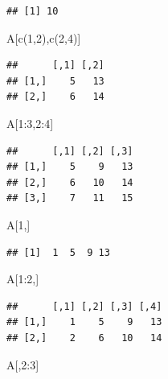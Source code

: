\documentclass[
]{book}
\newenvironment{Shaded}{\begin{snugshade}}{\end{snugshade}}
\newcommand{\DecValTok}[1]{\textcolor[rgb]{0.00,0.00,0.81}{#1}}
\newcommand{\FunctionTok}[1]{\textcolor[rgb]{0.00,0.00,0.00}{#1}}
\newcommand{\NormalTok}[1]{#1}
\newcommand{\SpecialCharTok}[1]{\textcolor[rgb]{0.00,0.00,0.00}{#1}}
\begin{document}
\begin{verbatim}
## [1] 10
\end{verbatim}

\begin{Shaded}
\begin{Highlighting}[]
\NormalTok{A[}\FunctionTok{c}\NormalTok{(}\DecValTok{1}\NormalTok{,}\DecValTok{2}\NormalTok{),}\FunctionTok{c}\NormalTok{(}\DecValTok{2}\NormalTok{,}\DecValTok{4}\NormalTok{)]}
\end{Highlighting}
\end{Shaded}

\begin{verbatim}
##      [,1] [,2]
## [1,]    5   13
## [2,]    6   14
\end{verbatim}

\begin{Shaded}
\begin{Highlighting}[]
\NormalTok{A[}\DecValTok{1}\SpecialCharTok{:}\DecValTok{3}\NormalTok{,}\DecValTok{2}\SpecialCharTok{:}\DecValTok{4}\NormalTok{]}
\end{Highlighting}
\end{Shaded}

\begin{verbatim}
##      [,1] [,2] [,3]
## [1,]    5    9   13
## [2,]    6   10   14
## [3,]    7   11   15
\end{verbatim}

\begin{Shaded}
\begin{Highlighting}[]
\NormalTok{A[}\DecValTok{1}\NormalTok{,]}
\end{Highlighting}
\end{Shaded}

\begin{verbatim}
## [1]  1  5  9 13
\end{verbatim}

\begin{Shaded}
\begin{Highlighting}[]
\NormalTok{A[}\DecValTok{1}\SpecialCharTok{:}\DecValTok{2}\NormalTok{,]}
\end{Highlighting}
\end{Shaded}

\begin{verbatim}
##      [,1] [,2] [,3] [,4]
## [1,]    1    5    9   13
## [2,]    2    6   10   14
\end{verbatim}

\begin{Shaded}
\begin{Highlighting}[]
\NormalTok{A[,}\DecValTok{2}\SpecialCharTok{:}\DecValTok{3}\NormalTok{]}
\end{Highlighting}
\end{Shaded}
\end{document}
